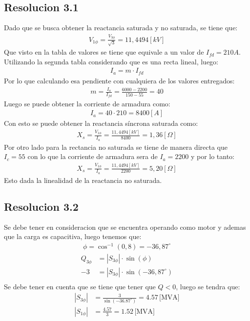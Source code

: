 \subsection*{Resolucion 3.1}
Dado que se busca obtener la reactancia saturada y no saturada, se tiene que:
\begin{align}
    V_{1\phi} = \frac{V_{3\phi}}{ \sqrt{3}} =11,4494[kV]
\end{align}
Que visto en la tabla de valores se tiene que equivale a un valor de $I_{fd} = 210 A$. Utilizando la segunda tabla considerando que es una recta lineal, luego:
\begin{align}
    I_{a} = m \cdot I_{fd}
\end{align}
Por lo que calculando esa pendiente con cualquiera de los valores entregados:
\begin{align}
    m = \frac{I_{a}}{I_{fd}} = \frac{6000-2200}{150-55} = 40
\end{align}
Luego se puede obtener la corriente de armadura como:
\begin{align}
    I_{a} = 40 \cdot 210 = 8400 [A]
\end{align}
Con esto se puede obtener la reactancia síncrona saturada como:
\begin{align}
    X_{s} = \frac{V_{1\phi}}{I_{a}} = \frac{11,4494[kV]}{8400} = 1,36[\Omega]
\end{align}
Por otro lado para la rectancia no saturada se tiene de manera directa que $I_{c} = 55$ con lo que la corriente de armadura sera de $I_{a} = 2200$ y por lo tanto:
\begin{align}
    X_{s} = \frac{V_{1\phi}}{I_{a}} = \frac{11,4494[kV]}{2200} = 5,20[\Omega]
\end{align}
Esto dada la linealidad de la reactancia no saturada.
\subsection*{Resolucion 3.2}
Se debe tener en consideracion que se encuentra operando como motor y ademas que la carga es capacitiva, luego tenemos que:
\begin{align}
    \phi = \cos^{-1}(0,8) = -36,87^{\circ}
\end{align}
\begin{align}
    Q_{3\phi} &= |S_{3\phi}| \cdot \sin(\phi)\\
    -3 &= |S_{3\phi}| \cdot \sin(-36,87^{\circ})\\ 
\end{align}
Se debe tener en cuenta que se tiene que tener que $Q<0$, luego se tendra que:
\begin{align}
    |S_{3\phi}| &= \frac{3}{\sin(-36.87^{\circ})} = 4.57 \, \text{[MVA]} \\
    |S_{1\phi}| &= \frac{4.57}{3} = 1.52 \, \text{[MVA]}
\end{align}

